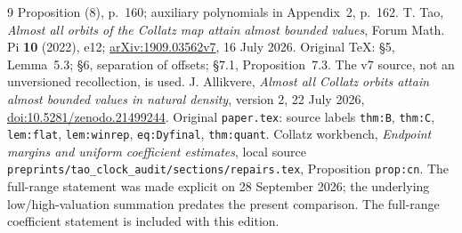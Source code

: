 \documentclass[11pt]{article}
\theoremstyle{remark}\newtheorem{remark}[proposition]{Remark}
\begin{document}
\begin{thebibliography}{9}
Proposition (8), p.~160; auxiliary polynomials in Appendix~2, p.~162.
 T. Tao, \emph{Almost all orbits of the Collatz map attain
almost bounded values}, Forum Math. Pi \textbf{10} (2022), e12;
\href{https://arxiv.org/abs/1909.03562v7}{arXiv:1909.03562v7}, 16 July 2026.
Original TeX: \S5, Lemma~5.3; \S6, separation of offsets; \S7.1,
Proposition~7.3. The v7 source, not an unversioned recollection, is used.
 J. Allikvere, \emph{Almost all Collatz orbits attain
almost bounded values in natural density}, version 2, 22 July 2026,
\href{https://doi.org/10.5281/zenodo.21499244}{doi:10.5281/zenodo.21499244}.
Original \texttt{paper.tex}: source labels \texttt{thm:B},
\texttt{thm:C}, \texttt{lem:flat}, \texttt{lem:winrep},
\texttt{eq:Dyfinal}, \texttt{thm:quant}.
 Collatz workbench, \emph{Endpoint margins and uniform
coefficient estimates}, local source
\texttt{preprints/tao\_clock\_audit/sections/repairs.tex},
Proposition \texttt{prop:cn}. The full-range statement was made explicit
on 28 September 2026; the underlying low/high-valuation summation predates
the present comparison. The full-range coefficient statement is included
with this edition.
\end{thebibliography}
\end{document}

